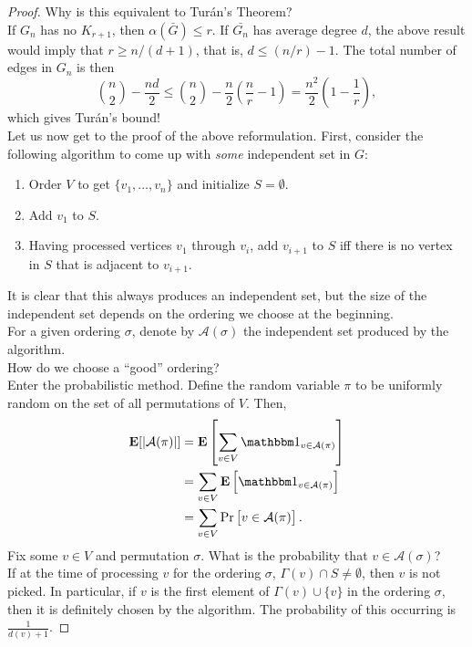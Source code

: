 		\begin{proof}
			Why is this equivalent to Tur\'{a}n's Theorem?\\
			If $G_n$ has no $K_{r+1}$, then $\alpha(\bar{G}) \le r$. If $\bar{G_n}$ has average degree $d$, the above result would imply that $r \ge n/(d+1)$, that is, $d \le (n/r) - 1$. The total number of edges in $G_n$ is then
			\[ \binom{n}{2} - \frac{nd}{2} \le \binom{n}{2} - \frac{n}{2} \left(\frac{n}{r} - 1\right) = \frac{n^2}{2} \left(1 - \frac{1}{r}\right), \]
			which gives Tur\'{a}n's bound!\\

			Let us now get to the proof of the above reformulation. First, consider the following algorithm to come up with \emph{some} independent set in $G$:
			\begin{enumerate}
				\item Order $V$ to get $\{v_1,\ldots,v_n\}$ and initialize $S = \emptyset$.
				\item Add $v_1$ to $S$.
				\item Having processed vertices $v_1$ through $v_i$, add $v_{i+1}$ to $S$ iff there is no vertex in $S$ that is adjacent to $v_{i+1}$.
			\end{enumerate}
			It is clear that this always produces an independent set, but the size of the independent set depends on the ordering we choose at the beginning.\\
			For a given ordering $\sigma$, denote by $\mathcal{A}(\sigma)$ the independent set produced by the algorithm.\\
			How do we choose a ``good'' ordering?\\
			Enter the probabilistic method. Define the random variable $\pi$ to be uniformly random on the set of all permutations of $V$. Then,
			\begin{align*}
				\expec[ | \mathcal{A}(\pi) | ] &= \expec\left[ \sum_{v \in V} \indic_{v \in \mathcal{A}(\pi)} \right] \\
				&= \sum_{v \in V} \expec\left[ \indic_{v \in \mathcal{A}(\pi)} \right] \\
				&= \sum_{v \in V} \Pr\left[ v \in \mathcal{A}(\pi) \right].
			\end{align*}
			Fix some $v \in V$ and permutation $\sigma$. What is the probability that $v \in \mathcal{A}(\sigma)$?\\
			If at the time of processing $v$ for the ordering $\sigma$, $\Gamma(v) \cap S \ne \emptyset$, then $v$ is not picked. In particular, if $v$ is the first element of $\Gamma(v) \cup \{v\}$ in the ordering $\sigma$, then it is definitely chosen by the algorithm. The probability of this occurring is $\frac{1}{d(v) + 1}$.

\end{proof}
